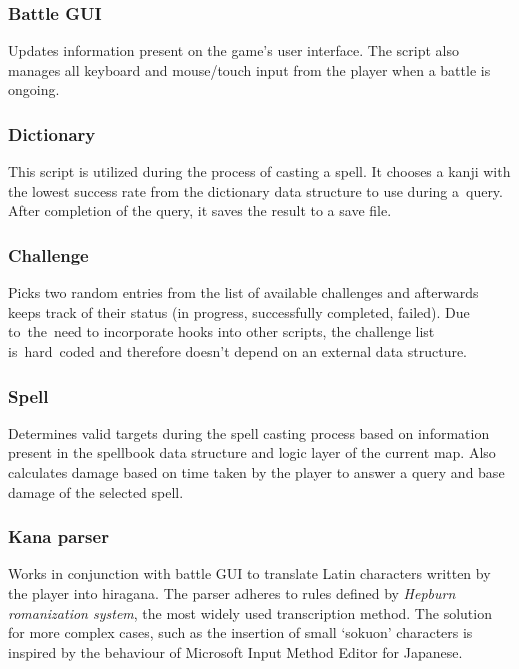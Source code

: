 \documentclass[thesis=B,english,hidelinks]{FITthesisXE}[2012/06/26]
\begin{document}
\subsubsection{Battle GUI}

Updates information present on the game's user interface. The script also manages all keyboard and mouse/touch input from the player when a battle is ongoing.

\subsubsection{Dictionary}

This script is utilized during the process of casting a spell. It chooses a kanji with the lowest success rate from the dictionary data structure to use during a~query. After completion of the query, it saves the result to a save file.

\subsubsection{Challenge}

Picks two random entries from the list of available challenges and afterwards keeps track of their status (in progress, successfully completed, failed). Due to~the~need to incorporate hooks into other scripts, the challenge list is~hard~coded and therefore doesn't depend on an external data structure.

\subsubsection{Spell}

Determines valid targets during the spell casting process based on information present in the spellbook data structure and logic layer of the current map. Also calculates damage based on time taken by the player to answer a query and base damage of the selected spell.

\newpage

\subsubsection{Kana parser}

Works in conjunction with battle GUI to translate Latin characters written by the player into hiragana. The parser adheres to rules defined by \emph{Hepburn romanization system}, the most widely used transcription method. The solution for more complex cases, such as the insertion of small `sokuon' characters is inspired by the behaviour of Microsoft Input Method Editor for Japanese.
\end{document}
